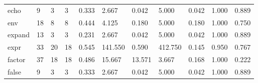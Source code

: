 \begin{longtable}{lp{1.2cm}p{1.2cm}p{1.2cm}p{1.2cm}p{1.2cm}p{1.2cm}p{1.2cm}p{1.2cm}p{1.2cm}p{1.2cm}}
echo      &                            9 &                  3 &                                 3 &                                      0.333 &                                  2.667 &                                        0.042 &                             5.000 &                                   0.042 &                              1.000 &                                              0.889 \\
env       &                           18 &                  8 &                                 8 &                                      0.444 &                                  4.125 &                                        0.180 &                             5.000 &                                   0.180 &                              1.000 &                                              0.750 \\
expand    &                           13 &                  3 &                                 3 &                                      0.231 &                                  2.667 &                                        0.042 &                             5.000 &                                   0.042 &                              1.000 &                                              0.889 \\
expr      &                           33 &                 20 &                                18 &                                      0.545 &                                141.550 &                                        0.590 &                           412.750 &                                   0.145 &                              0.950 &                                              0.767 \\
factor    &                           37 &                 18 &                                18 &                                      0.486 &                                 15.667 &                                       13.571 &                             3.667 &                                   0.168 &                              1.000 &                                              0.222 \\
false     &                            9 &                  3 &                                 3 &                                      0.333 &                                  2.667 &                                        0.042 &                             5.000 &                                   0.042 &                              1.000 &                                              0.889 \\

\end{longtable}
